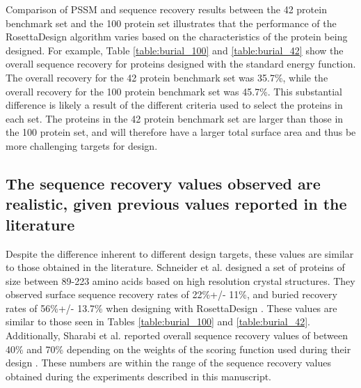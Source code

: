 Comparison of \ac{PSSM} and sequence recovery results between the 42 protein benchmark set and the 100 protein set illustrates that the performance of the RosettaDesign algorithm varies based on the characteristics of the protein being designed.
For example, Table \ref{table:burial_100} and \ref{table:burial_42} show the overall sequence recovery for proteins designed with the standard energy function.
The overall recovery for the 42 protein benchmark set was 35.7\%, while the overall recovery for the 100 protein benchmark set was 45.7\%.
This substantial difference is likely a result of the different criteria used to select the proteins in each set.
The proteins in the 42 protein benchmark set are larger than those in the 100 protein set, and will therefore have a larger total surface area and thus be more challenging targets for design.

\subsection{The sequence recovery values observed are realistic, given previous values reported in the literature}
Despite the difference inherent to different design targets, these values are similar to those obtained in the literature.
Schneider et al. designed a set of proteins of size between 89-223 amino acids based on high resolution crystal structures.
They observed surface sequence recovery rates of 22\%+/- 11\%, and buried recovery rates of 56\%+/- 13.7\% when designing with RosettaDesign \citep{Schneider:2009ig}.
These values are similar to those seen in Tables \ref{table:burial_100} and \ref{table:burial_42}.
Additionally, Sharabi et al. reported overall sequence recovery values of between 40\% and 70\% depending on the weights of the scoring function used during their design \citep{Sharabi:2011ev}.
These numbers are within the range of the sequence recovery values obtained during the experiments described in this manuscript.

